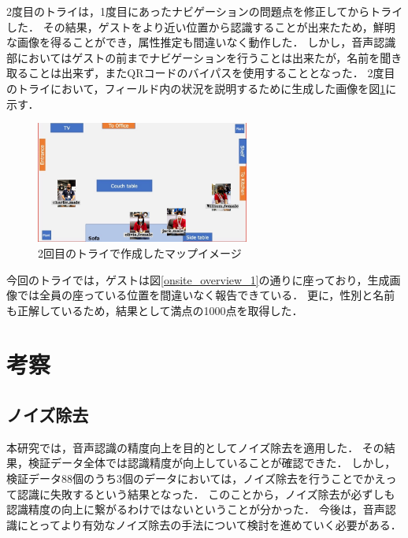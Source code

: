 \documentclass[a4j]{jarticle}
\begin{document}
2度目のトライは，1度目にあったナビゲーションの問題点を修正してからトライした．
その結果，ゲストをより近い位置から認識することが出来たため，鮮明な画像を得ることができ，属性推定も間違いなく動作した．
しかし，音声認識部においてはゲストの前までナビゲーションを行うことは出来たが，名前を聞き取ることは出来ず，またQRコードのバイパスを使用することとなった．
2度目のトライにおいて，フィールド内の状況を説明するために生成した画像を図\ref{result_FMM_2}に示す．
\begin{figure}[t]
  \centering
  \includegraphics[width=7cm]{images/FMM/mapimage.png}
  \caption{2回目のトライで作成したマップイメージ}
  \label{result_FMM_2}
\end{figure}
今回のトライでは，ゲストは図\ref{onsite_overview_1}の通りに座っており，生成画像では全員の座っている位置を間違いなく報告できている．
更に，性別と名前も正解しているため，結果として満点の1000点を取得した．


\section{考察}

\subsection{ノイズ除去}
本研究では，音声認識の精度向上を目的としてノイズ除去を適用した．
その結果，検証データ全体では認識精度が向上していることが確認できた．
しかし，検証データ88個のうち3個のデータにおいては，ノイズ除去を行うことでかえって認識に失敗するという結果となった．
このことから，ノイズ除去が必ずしも認識精度の向上に繋がるわけではないということが分かった．
今後は，音声認識にとってより有効なノイズ除去の手法について検討を進めていく必要がある．
\end{document}
